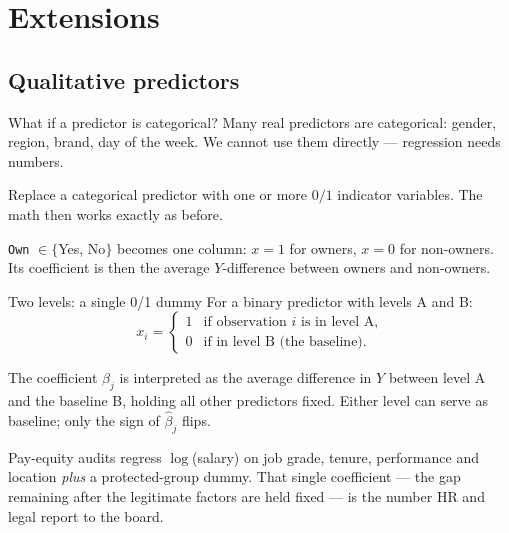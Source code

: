 \documentclass[aspectratio=169,11pt]{beamer}
\begin{document}
\section{Extensions}
\subsection{Qualitative predictors}

\begin{frame}{What if a predictor is categorical?}
  Many real predictors are categorical: gender, region, brand, day of
  the week. We cannot use them directly --- regression needs numbers.
  \begin{takeaway}
    Replace a categorical predictor with one or more $0/1$ indicator
    variables. The math then works exactly as before.
  \end{takeaway}
  \begin{numexample}
    \texttt{Own} $\in\{$Yes, No$\}$ becomes one column: $x=1$ for owners,
    $x=0$ for non-owners. Its coefficient is then the average
    $Y$-difference between owners and non-owners.
  \end{numexample}
\end{frame}

\begin{frame}{Two levels: a single 0/1 dummy}
  For a binary predictor with levels A and B:
  \[
    x_i = \begin{cases}
            1 & \text{if observation $i$ is in level A,} \\
            0 & \text{if in level B (the baseline).}
          \end{cases}
  \]
  \begin{readme}
    The coefficient $\beta_j$ is interpreted as the average difference
    in $Y$ between level A and the baseline B, holding all other
    predictors fixed. Either level can serve as baseline; only the
    sign of $\hat\beta_j$ flips.
  \end{readme}
  \begin{industry}
    Pay-equity audits regress $\log$(salary) on job grade, tenure,
    performance and location \emph{plus} a protected-group dummy. That single
    coefficient --- the gap remaining after the legitimate factors are held
    fixed --- is the number HR and legal report to the board.
  \end{industry}
\end{frame}
\end{document}
